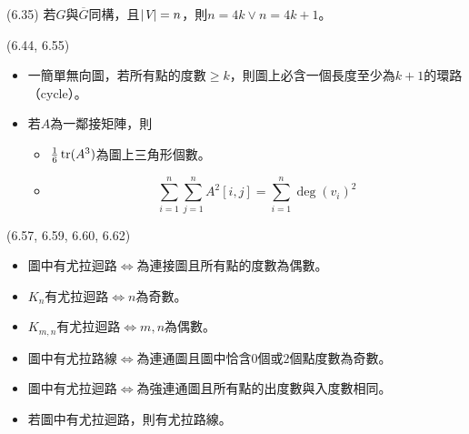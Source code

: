 \item \begin{theorem}{(6.35)} 若$G$與$\overline{G}$同構，且$|\textit{V}| = n$，則$n = 4k \lor n = 4k + 1$。
\end{theorem}

\item \begin{theorem}{(6.44, 6.55)} \quad\quad
    \begin{itemize}
        \item 一簡單無向圖，若所有點的度數$\ge k$，則圖上必含一個長度至少為$k + 1$的環路（cycle）。
        \item 若$A$為一鄰接矩陣，則\begin{itemize}
            \item $\frac{1}{6}\operatorname{tr}(A^3)$為圖上三角形個數。
            \item \begin{equation}
                \sum_{i = 1}^{n}\sum_{j = 1}^{n} A^2[i, j] = \sum_{i = 1}^{n} \deg(v_i)^2
            \end{equation}
        \end{itemize}
    \end{itemize}
\end{theorem}

\item \begin{theorem}{(6.57, 6.59, 6.60, 6.62)} \quad\quad
    \begin{itemize}
        \item 圖中有尤拉迴路$\iff$為連接圖且所有點的度數為偶數。
        \item $K_n$有尤拉迴路$\iff$$n$為奇數。
        \item $K_{m, n}$有尤拉迴路$\iff$$m, n$為偶數。
        \item 圖中有尤拉路線$\iff$為連通圖且圖中恰含$0$個或$2$個點度數為奇數。
        \item 圖中有尤拉迴路$\iff$為強連通圖且所有點的出度數與入度數相同。
        \item 若圖中有尤拉迴路，則有尤拉路線。
    \end{itemize}
\end{theorem}

